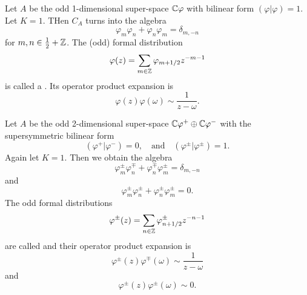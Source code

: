 Let $A$ be the odd 1-dimensional super-space $\mathbb{C}\varphi$ with bilinear
form $(\varphi|\varphi)=1$. Let $K=1$. THen $C_{A}$ turns into the
algebra
\begin{equation}
\varphi_{m}\varphi_{n}+\varphi_{n}\varphi_{m}=\delta_{m,-n}
\end{equation}
for $m,n\in\frac{1}{2}+\mathbb{Z}$. The (odd) formal distribution
\begin{equation}
\varphi(z)=\sum_{m\in\mathbb{Z}}\varphi_{m+1/2}z^{-m-1}
\end{equation}
is called a . Its operator product
expansion is
\begin{equation}
\varphi(z)\varphi(\omega)\sim\frac{1}{z-\omega}.
\end{equation}

Let $A$ be the odd 2-dimensional super-space
$\mathbb{C}\varphi^{+}\oplus\mathbb{C}\varphi^{-}$ with the supersymmetric bilinear
form
\begin{equation}
(\varphi^{+}|\varphi^{-})=0,\quad\mbox{and}\quad
(\varphi^{\pm}|\varphi^{\pm})=1.
\end{equation}
Again let $K=1$. Then we obtain the algebra
\begin{equation}
\varphi^{\pm}_{m}\varphi^{\mp}_{n}+\varphi^{\mp}_{n}\varphi^{\pm}_{m}=\delta_{m,-n}
\end{equation}
and
\begin{equation}
\varphi^{\pm}_{m}\varphi^{\pm}_{n}+\varphi^{\pm}_{n}\varphi^{\pm}_{m}=0.
\end{equation}
The odd formal distributions
\begin{equation}
\varphi^{\pm}(z)=\sum_{n\in\mathbb{Z}}\varphi^{\pm}_{n+1/2}z^{-n-1}
\end{equation}
are called  and their operator product
expansion is
\begin{equation}
\varphi^{\pm}(z)\varphi^{\mp}(\omega)\sim\frac{1}{z-\omega}
\end{equation}
and
\begin{equation}
\varphi^{\pm}(z)\varphi^{\pm}(\omega)\sim0.
\end{equation}
